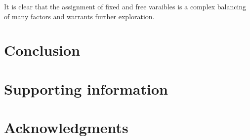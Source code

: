 \documentclass[10pt,letterpaper]{article}
\begin{document}
It is clear that the assignment of fixed and free varaibles is a complex balancing of many factors and warrants further exploration.


%


\section*{Conclusion}



\section*{Supporting information}


\section*{Acknowledgments}

\nolinenumbers

%
%
\end{document}
